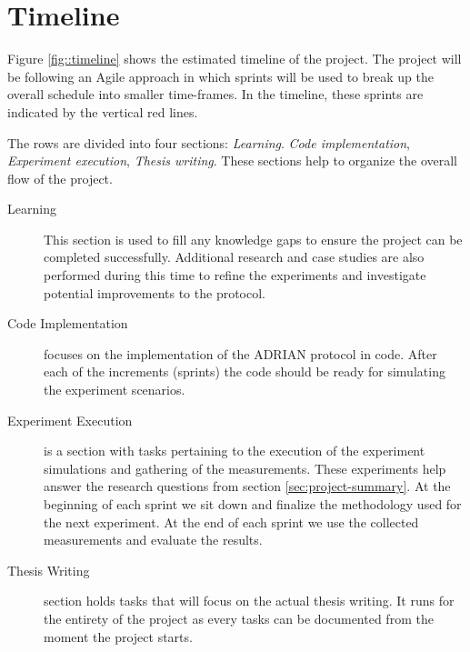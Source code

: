\section{Timeline} \label{sec:timeline}
Figure \ref{fig::timeline} shows the estimated timeline of the project. The project will be following an Agile approach in which sprints will be used to break up the overall schedule into smaller time-frames. In the timeline, these sprints are indicated by the vertical red lines. 

The rows are divided into four sections: \emph{Learning}. \emph{Code implementation}, \emph{Experiment execution}, \emph{Thesis writing}. These sections help to organize the overall flow of the project.

\begin{description}
    \item[Learning] This section is used to fill any knowledge gaps to ensure the project can be completed successfully. Additional research and case studies are also performed during this time to refine the experiments and investigate potential improvements to the protocol.
    \item[Code Implementation] focuses on the implementation of the ADRIAN protocol in code. After each of the increments (sprints) the code should be ready for simulating the experiment scenarios. 
    \item[Experiment Execution] is a section with tasks pertaining to the execution of the experiment simulations and gathering of the measurements. These experiments help answer the research questions from section \ref{sec:project-summary}. At the beginning of each sprint we sit down and finalize the methodology used for the next experiment. At the end of each sprint we use the collected measurements and evaluate the results.
    \item[Thesis Writing] section holds tasks that will focus on the actual thesis writing. It runs for the entirety of the project as every tasks can be documented from the moment the project starts. 
\end{description}

